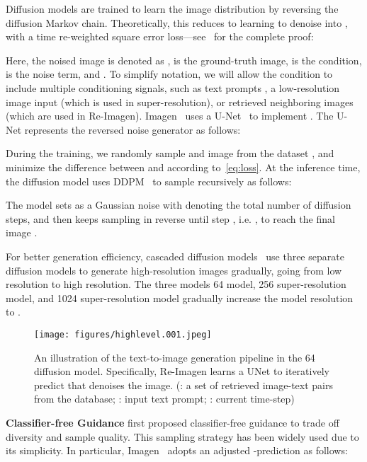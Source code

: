 \documentclass{article} \usepackage{iclr2023_conference,times}
\newcommand{\modelname}{{Re-Imagen}\xspace}
\begin{document}
Diffusion models are trained to learn the image distribution by reversing the diffusion Markov chain. Theoretically, this reduces to learning to denoise  into , with a time re-weighted square error loss---see~\cite{ho2020denoising} for the complete proof:

Here, the noised image is denoted as ,  is the ground-truth image,  is the condition,  is the noise term,  and . To simplify notation, we will allow the condition  to include multiple conditioning signals, such as text prompts , a low-resolution image input  (which is used in super-resolution), or retrieved neighboring images  (which are used in \modelname).  Imagen~\citep{saharia2022photorealistic} uses a U-Net~\citep{ronneberger2015u} to implement . The U-Net represents the reversed noise generator as follows:


During the training, we randomly sample  and image  from the dataset , and minimize the difference between  and  according to~\autoref{eq:loss}. At the inference time, the diffusion model uses DDPM~\citep{ho2020denoising} to sample recursively as follows:

The model sets  as a Gaussian noise with  denoting the total number of diffusion steps, and then keeps sampling in reverse until step , i.e. ,  to reach the final image .

For better generation efficiency, cascaded diffusion models~\citep{ho2022cascaded,ramesh2022hierarchical,saharia2022photorealistic} use three separate diffusion models to generate high-resolution images gradually, going from low resolution to high resolution. The three models 64 model, 256 super-resolution model, and 1024 super-resolution model gradually increase the model resolution to .



\begin{figure}[!t]
    \centering
    \texttt{[image: figures/highlevel.001.jpeg]}
    \caption{
        An illustration of the text-to-image generation pipeline in the 64 diffusion model. Specifically, \modelname learns a UNet to iteratively predict  that denoises the image. (: a set of retrieved image-text pairs from the database; : input text prompt; : current time-step) 
    }
    \label{fig:model}
\end{figure}

\noindent \textbf{Classifier-free Guidance}
\label{sec:cfg}
\cite{ho2021classifier} first proposed classifier-free guidance to trade off diversity and sample quality. This sampling strategy has been widely used due to its simplicity. In particular, Imagen~\citep{saharia2022photorealistic} adopts an adjusted -prediction as follows:
\end{document}
